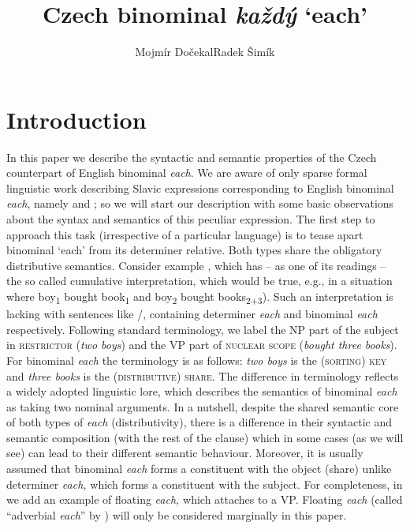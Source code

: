 \documentclass[output=paper,colorlinks,citecolor=brown,newtxmath]{langscibook}
\author{Mojmír Dočekal\affiliation{Masaryk University in Brno}\lastand Radek Šimík\affiliation{Charles University in Prague}\orcid{0000-0002-4736-195X}}
\title{Czech binominal \textit{každý} `each'}
\begin{document}
\maketitle

\section{Introduction}\label{intro}

In this paper we describe the syntactic and semantic properties of the Czech counterpart of English binominal \textit{each}. We are aware of only sparse formal linguistic work describing Slavic expressions corresponding to English binominal \textit{each}, namely \cite{Przepiorkowski2014} and \cite{Przepiorkowski2015}; so we will start our description  with some basic observations about the syntax and semantics of this peculiar expression. The first step to approach this task (irrespective of a particular language) is to tease apart binominal `each' from its determiner relative. Both types share the obligatory distributive semantics. Consider example , which has -- as one of its readings -- the so called cumulative interpretation, which would be true, e.g., in a situation where boy\textsubscript{1} bought book\textsubscript{1} and boy\textsubscript{2} bought books\textsubscript{2+3}). Such an interpretation is lacking with sentences like /, containing determiner \textit{each} and binominal \textit{each} respectively. Following standard terminology, we label the NP part of the subject in  \textsc{restrictor} (\textit{two boys}) and the VP part of  \textsc{nuclear scope} (\textit{bought three books}). For binominal \textit{each} the terminology is as follows: \textit{two boys} is the \textsc{(sorting) key} and \textit{three books} is the \textsc{(distributive) share}. The difference in terminology reflects a widely adopted linguistic lore, which describes the semantics of binominal \textit{each} as taking two nominal arguments. In a nutshell, despite the shared semantic core of both types of \textit{each} (distributivity), there is a difference in their syntactic and semantic composition (with the rest of the clause) which in some cases (as we will see) can lead to their different semantic behaviour. Moreover, it is usually assumed that binominal \textit{each} forms a constituent with the object (share) unlike determiner \textit{each,} which forms a constituent with the subject. For completeness, in  we add an example of floating \textit{each,} which attaches to a VP. Floating \textit{each} (called “adverbial \textit{each}'' by \citealt{Safir1988}) will only be considered marginally in this paper.
\end{document}
